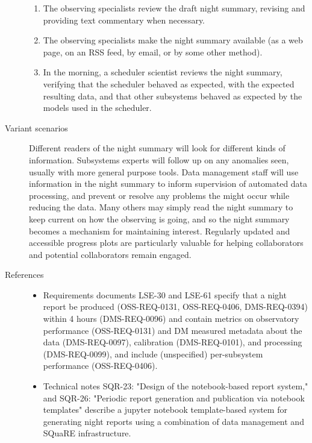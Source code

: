 \begin{description}
\begin{enumerate}
\item The observing specialists review the draft night summary, revising and providing text commentary when necessary.
\item The observing specialists make the night summary available (as a web page, on an RSS feed, by email, or by some other method).
\item In the morning, a scheduler scientist reviews the night summary, verifying that the scheduler behaved as expected, with the expected resulting data, and that other subsystems behaved as expected by the models used in the scheduler.
\end{enumerate}
\item[{Variant scenarios}] Different readers of the night summary will look for different kinds of information. Subsystems experts will follow up on any anomalies seen, usually with more general purpose tools. Data management staff will use information in the night summary to inform supervision of automated data processing, and prevent or resolve any problems the might occur while reducing the data. Many others may simply read the night summary to keep current on how the observing is going, and so the night summary becomes a mechanism for maintaining interest. Regularly updated and accessible progress plots are particularly valuable for helping collaborators and potential collaborators remain engaged.
\item[{References}] \begin{itemize}
\item Requirements documents LSE-30 and LSE-61 specify that a night report be produced (OSS-REQ-0131, OSS-REQ-0406, DMS-REQ-0394) within 4 hours (DMS-REQ-0096) and contain metrics on observatory performance (OSS-REQ-0131) and DM measured metadata about the data (DMS-REQ-0097), calibration (DMS-REQ-0101), and processing (DMS-REQ-0099), and include (unspecified) per-subsystem performance (OSS-REQ-0406).
\item Technical notes SQR-23: "Design of the notebook-based report system," and SQR-26: "Periodic report generation and publication via notebook templates" describe a jupyter notebook template-based system for generating night reports using a combination of data management and SQuaRE infrastructure.
\end{itemize}
\end{description}
